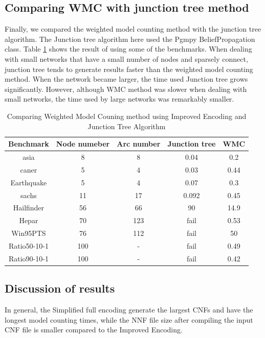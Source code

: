 \subsection{Comparing WMC with junction tree method}
Finally, we compared the weighted model counting method with the junction tree algorithm. The Junction tree algorithm here used the Pgmpy BeliefPropagation class. Table \ref{tab:junctree_vs_WMC} shows the result of using some of the benchmarks. When dealing with small networks that have a small number of nodes and sparsely connect, junction tree tends to generate results faster than the weighted model counting method. When the network became larger, the time used Junction tree grows significantly. However, although WMC method was slower when dealing with small networks, the time used by large networks was remarkably smaller.

\begin{table}[]
    \centering
    \begin{tabular}{c|c c c c}
        \hline
         Benchmark	&	Node numeber	&	Arc number	&	Junction tree	&	WMC	\\
         \hline
         \hline
        asia	&	8	&	8	&	0.04	&	0.2	\\
        caner	&	5	&	4	&	0.03	&	0.44	\\
        Earthquake	&	5	&	4	&	0.07	&	0.3	\\
        sachs	&	11	&	17	&	0.092	&	0.45	\\
        Hailfinder	&	56	&	66	&	90	&	14.9	\\
        Hepar	&	70	&	123	&	fail	&	0.53	\\
        Win95PTS	&	76	&	112	&	fail	&	50	\\
        Ratio50-10-1	&	100	&	-	&	fail	&	0.49	\\
        Ratio90-10-1	&	100	&	-	&	fail	&	0.42	\\
        \hline
    \end{tabular}
    \caption{Comparing Weighted Model Couning method using Improved Encoding and Junction Tree Algorithm}
    \label{tab:junctree_vs_WMC}
\end{table}

\subsection{Discussion of results}
In general, the Simplified full encoding generate the largest CNFs and have the longest model counting times, while the NNF file size after compiling the input CNF file is smaller compared to the Improved Encoding.\\

